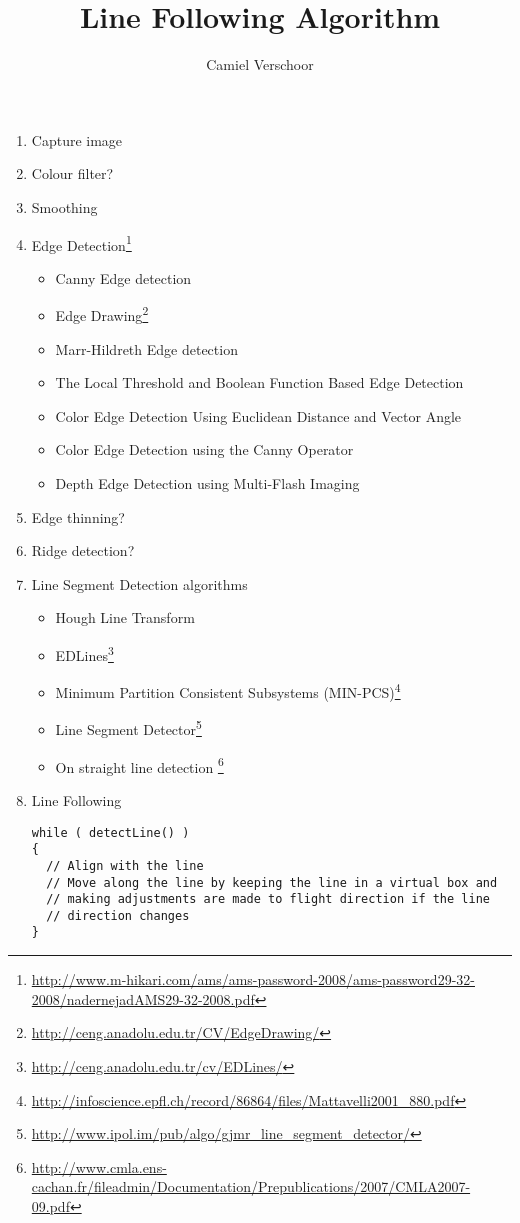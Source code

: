 \documentclass[12pt]{article}
\title{Line Following Algorithm}
\author{Camiel Verschoor}
\begin{document}
\maketitle

\begin{enumerate}
\item Capture image
\item Colour filter?
\item Smoothing
\item Edge Detection\footnote{\url{http://www.m-hikari.com/ams/ams-password-2008/ams-password29-32-2008/nadernejadAMS29-32-2008.pdf}}
	\begin{itemize}
	\item Canny Edge detection
	\item Edge Drawing\footnote{\url{http://ceng.anadolu.edu.tr/CV/EdgeDrawing/}}
	\item Marr-Hildreth Edge detection
	\item The Local Threshold and Boolean Function Based Edge Detection
	\item Color Edge Detection Using Euclidean Distance and Vector Angle
	\item Color Edge Detection using the Canny Operator
	\item Depth Edge Detection using Multi-Flash Imaging
	\end{itemize}
\item Edge thinning?
\item Ridge detection?
\item Line Segment Detection algorithms
	\begin{itemize}
	\item Hough Line Transform
	\item EDLines\footnote{\url{http://ceng.anadolu.edu.tr/cv/EDLines/}}
	\item Minimum Partition Consistent Subsystems  (MIN-PCS)\footnote{\url{http://infoscience.epfl.ch/record/86864/files/Mattavelli2001_880.pdf}}
	\item Line Segment Detector\footnote{\url{http://www.ipol.im/pub/algo/gjmr_line_segment_detector/}}
	\item On straight line detection \footnote{\url{http://www.cmla.ens-cachan.fr/fileadmin/Documentation/Prepublications/2007/CMLA2007-09.pdf}}
	\end{itemize}
\item Line Following
	\begin{verbatim}
while (	detectLine() ) 
{
  // Align with the line
  // Move along the line by keeping the line in a virtual box and
  // making adjustments are made to flight direction if the line
  // direction changes
}
	\end{verbatim}
\end{enumerate}
\end{document}
